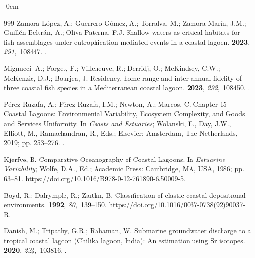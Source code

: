 \documentclass[jmse,article,accept,pdftex,oneauthor]{Definitions/mdpi}
\begin{document}
\begin{adjustwidth}{-\extralength}{0cm}
\begin{thebibliography}{999}
Zamora-López, A.; Guerrero-Gómez, A.; Torralva, M.; Zamora-Marín, J.M.;
  Guillén-Beltrán, A.; Oliva-Paterna, F.J.
\newblock Shallow waters as critical habitats for fish assemblages under
  eutrophication-mediated events in a coastal lagoon.
 {\bf 2023}, {\em
  291},~108447.
.

Mignucci, A.; Forget, F.; Villeneuve, R.; Derridj, O.; McKindsey, C.W.;
  McKenzie, D.J.; Bourjea, J.
\newblock Residency, home range and inter-annual fidelity of three coastal fish
  species in a Mediterranean coastal lagoon.
 {\bf 2023}, {\em
  292},~108450.
.

Pérez-Ruzafa, A.; Pérez-Ruzafa, I.M.; Newton, A.; Marcos, C.
\newblock Chapter 15---Coastal Lagoons: Environmental Variability, Ecosystem
  Complexity, and Goods and Services Uniformity. In {\em Coasts and Estuaries};
  Wolanski, E., Day, J.W., Elliott, M., Ramachandran, R., Eds.; Elsevier:  Amsterdam, The Netherlands, 2019; pp. 253--276.
.

Kjerfve, B.
\newblock Comparative Oceanography of Coastal Lagoons. In {\em Estuarine
  Variability}; Wolfe, D.A., Ed.; Academic Press:  {Cambridge, MA, USA,} %
1986; pp. 63--81.
\newblock
  {\url{https://doi.org/10.1016/B978-0-12-761890-6.50009-5}}.

Boyd, R.; Dalrymple, R.; Zaitlin, B.
\newblock Classification of clastic coastal depositional environments.
 {\bf 1992}, {\em 80},~139--150.
\url{https://doi.org/10.1016/0037-0738(92)90037-R}.

Danish, M.; Tripathy, G.R.; Rahaman, W.
\newblock Submarine groundwater discharge to a tropical coastal lagoon (Chilika
  lagoon, India): An estimation using Sr isotopes.
 {\bf 2020}, {\em 224},~103816.
.


\end{thebibliography}
\end{adjustwidth}
\end{document}

